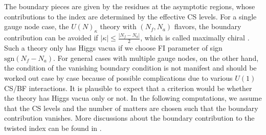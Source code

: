 \documentclass[a4paper,11pt]{article}
\begin{document}
The boundary pieces are given by the residues at the asymptotic regions, whose contributions to the index are determined by the effective CS levels. For a single gauge node case, the $U(N)_\kappa$ theory with $(N_f,N_a)$ flavors, the boundary contribution can be avoided if $|\kappa| \leq \frac{|N_f-N_a|}{2}$, which is called maximally chiral \cite{Benini:2011mf}. Such a theory only has Higgs vacua if we choose FI parameter of sign $\mathrm{sgn}(N_f-N_a)$. For general cases with multiple gauge nodes, on the other hand, the condition of the vanishing boundary condition is not manifest and should be worked out case by case because of possible complications due to various $U(1)$ CS/BF interactions. It is plausible to expect that a criterion would be whether the theory has Higgs vacua only or not. In the following computations, we assume that the CS levels and the number of matters are chosen such that the boundary contribution vanishes. More discussions about the boundary contribution to the twisted index can be found in \cite{Benini:2015noa,Benini:2016hjo,Closset:2016arn}.
\\
\end{document}
